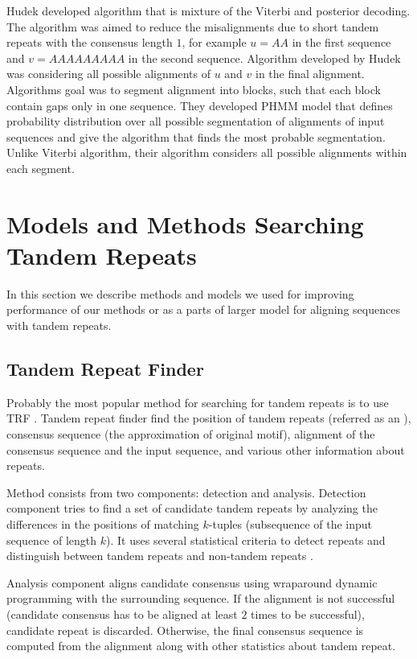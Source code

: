 Hudek \cite{Hudek2010} developed algorithm that is mixture of the Viterbi and
posterior decoding. The algorithm was aimed to reduce the misalignments due to
short tandem repeats with the consensus length $1$, for example $u=AA$ in the
first sequence and $v=AAAAAAAAA$ in the second sequence. Algorithm developed by
Hudek was considering all possible alignments of $u$ and $v$ in the final
alignment. Algorithms goal was to segment alignment into blocks, such that each
block contain gaps only in one sequence. They developed PHMM model that defines
probability distribution over all possible segmentation of alignments of input
sequences and give the algorithm that finds the most probable segmentation.
Unlike Viterbi algorithm, their algorithm considers all possible alignments
within each segment.

\section{Models and Methods Searching Tandem Repeats}

In this section we describe methods and models we used for improving
performance of our methods or as a parts of larger model for aligning sequences
with tandem repeats. 

\subsection{Tandem Repeat Finder}

Probably the most popular method for searching for tandem repeats is to use TRF
\cite{Benson1999}.  Tandem repeat finder find the position of tandem repeats
(referred as an ), consensus sequence (the approximation
of original motif), alignment of the consensus sequence and the input sequence,
and various other information about repeats.

Method consists from two components: detection and analysis. Detection
component tries to find a set of candidate tandem repeats by analyzing the
differences in the positions of matching $k$-tuples (subsequence of the input
sequence of length $k$). It uses several statistical criteria to detect repeats
and distinguish between tandem repeats and non-tandem repeats
\cite{Benson1999}.

Analysis component aligns candidate consensus using wraparound dynamic
programming \cite{Myers1989} with the surrounding sequence. If the alignment is
not successful (candidate consensus has to be aligned at least $2$ times to be
successful), candidate repeat is discarded. Otherwise, the final consensus
sequence is computed from the alignment along with other statistics about
tandem repeat.

